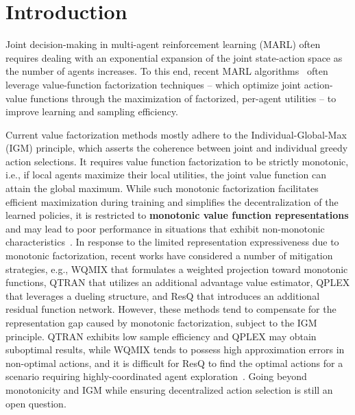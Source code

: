 
\section{Introduction}
Joint decision-making in multi-agent reinforcement learning (MARL) often requires dealing with 
an exponential expansion of the joint state-action space as the number of agents increases. To this end, recent MARL algorithms~\cite{VDN,NEURIPS2022_c40d1e40,QMIX,chen2023minimizing,chen2022multi} often leverage 
value-function factorization techniques -- which optimize joint action-value functions through the maximization of factorized, per-agent utilities -- to improve learning and sampling efficiency.  

Current value factorization methods mostly adhere to the Individual-Global-Max (IGM) \cite{QMIX} principle, which asserts the coherence between joint and individual greedy action selections. It requires value function factorization to be strictly monotonic, i.e., if local agents maximize their local utilities, 
the joint value function can attain the global maximum. While such monotonic factorization facilitates efficient maximization during training and simplifies the decentralization of the learned policies, it is restricted to {\bf monotonic value function representations} and may lead to poor performance in situations that exhibit non-monotonic characteristics~\cite{WQMIX}. 
In response to the limited representation expressiveness due to monotonic factorization, recent works have considered a number of mitigation strategies, e.g., WQMIX \cite{WQMIX} that formulates a weighted projection toward monotonic functions, QTRAN \cite{QTRAN} that utilizes an additional advantage value estimator, QPLEX \cite{QPLEX} that leverages a dueling structure, and ResQ \cite{ResQ} that introduces an additional residual function network. However, these methods tend to compensate for the representation gap caused by monotonic factorization, subject to the IGM principle.
QTRAN exhibits low sample efficiency and QPLEX may obtain suboptimal results, while WQMIX  tends to possess high approximation errors in non-optimal actions,  and it is difficult for ResQ to find the optimal actions for a scenario requiring highly-coordinated agent exploration~\cite{ResQ}. Going beyond monotonicity and IGM while ensuring decentralized action selection is still an open question\cite{mei2023remix}.


